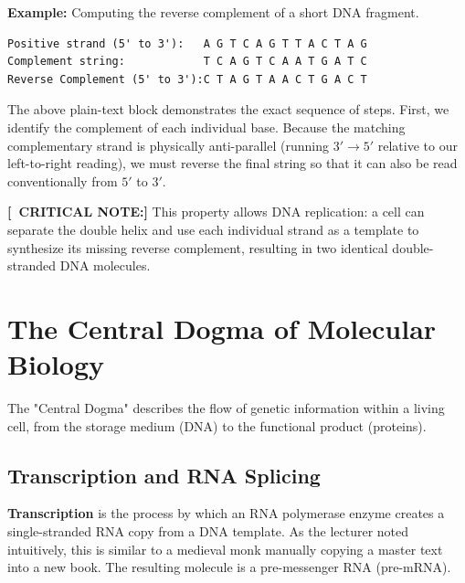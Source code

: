 \documentclass[11pt,a4paper]{article}
\newcommand{\sta}{\textbf{[\textasteriskcentered\ CRITICAL NOTE:] }}
\begin{document}
\textbf{Example:} Computing the reverse complement of a short DNA fragment.
\begin{verbatim}
Positive strand (5' to 3'):   A G T C A G T T A C T A G
Complement string:            T C A G T C A A T G A T C
Reverse Complement (5' to 3'):C T A G T A A C T G A C T 
\end{verbatim}

The above plain-text block demonstrates the exact sequence of steps. First, we identify the complement of each individual base. Because the matching complementary strand is physically anti-parallel (running \(3' \to 5'\) relative to our left-to-right reading), we must reverse the final string so that it can also be read conventionally from \(5'\) to \(3'\). 

\sta This property allows DNA replication: a cell can separate the double helix and use each individual strand as a template to synthesize its missing reverse complement, resulting in two identical double-stranded DNA molecules.

\section{The Central Dogma of Molecular Biology}

The "Central Dogma" describes the flow of genetic information within a living cell, from the storage medium (DNA) to the functional product (proteins).

\begin{center}
\end{center}

\subsection{Transcription and RNA Splicing}
\textbf{Transcription} is the process by which an RNA polymerase enzyme creates a single-stranded RNA copy from a DNA template. As the lecturer noted intuitively, this is similar to a medieval monk manually copying a master text into a new book. The resulting molecule is a pre-messenger RNA (pre-mRNA).
\end{document}
